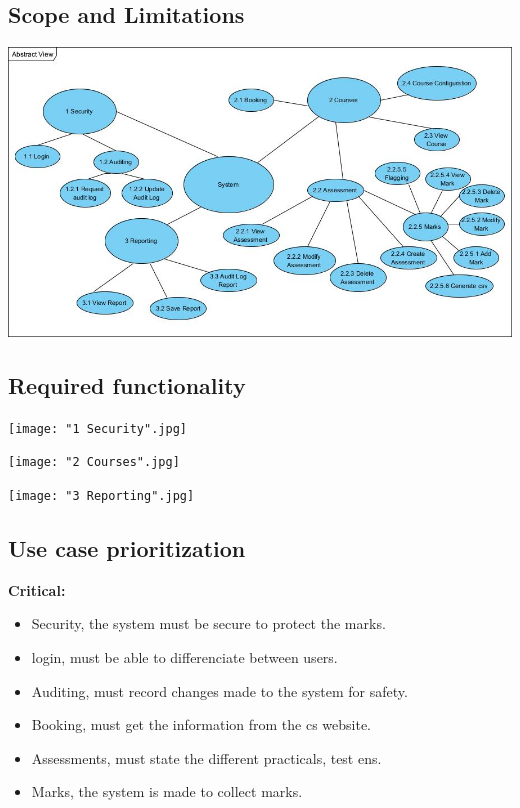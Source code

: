 \documentclass[10pt,a4paper]{article}
\begin{document}
\subsection{Scope and Limitations}

\begin{center}
\includegraphics[scale=0.5]{AbstractView.jpg}
\end{center}


\subsection{Required functionality}


\texttt{[image: "1 Security".jpg]}

\texttt{[image: "2 Courses".jpg]}

\texttt{[image: "3 Reporting".jpg]}

\subsection{Use case prioritization}

\textbf{Critical:}
 \begin{itemize}
	\item Security, the system must be secure to protect the marks.

	\item login, must be able to differenciate between users. 

	\item Auditing, must record changes made to the system for safety. 

	\item Booking, must get the information from the cs website.

	\item Assessments, must state the different practicals, test ens.

	\item Marks, the system is made to collect marks.
 \end{itemize}
 
\end{document}
